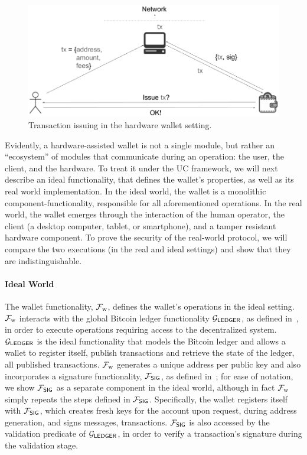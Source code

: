 \begin{figure}
    \begin{center}
        \includegraphics[width=0.75\columnwidth]{figures/hardware-wallets/user_wallet_bw.png}
    \end{center}
    \caption{Transaction issuing in the hardware wallet setting.}
    \label{fig:user_wallet}
\end{figure}

Evidently, a hardware-assisted wallet is not a single module, but rather an
``ecosystem'' of modules that communicate during an operation: the user, the
client, and the hardware. To treat it under the UC framework, we will next
describe an ideal functionality, that defines the wallet's properties, as well
as its real world implementation. In the ideal world, the wallet is a
monolithic component-functionality, responsible for all aforementioned
operations.  In the real world, the wallet emerges through the interaction of
the human operator, the client (\ie a desktop computer, tablet, or smartphone),
and a tamper resistant hardware component. To prove the security of the
real-world protocol, we will compare the two executions (in the real and ideal
settings) and show that they are indistinguishable.

\paragraph{Ideal World}
The wallet functionality, $\mathcal{F}_{\mathrm{w}}$, defines the wallet's operations in the ideal
setting. $\mathcal{F}_{\mathrm{w}}$ interacts with the global Bitcoin ledger functionality $\mathcal{G}_\mathsf{LEDGER}$,
as defined in~\cite{C:BMTZ17}, in order to execute operations requiring access
to the decentralized system. $\mathcal{G}_\mathsf{LEDGER}$ is the ideal functionality that models
the Bitcoin ledger and allows a wallet to register itself, publish transactions
and retrieve the state of the ledger, \ie all published transactions. $\mathcal{F}_{\mathrm{w}}$
generates a unique address per public key and also incorporates a signature
functionality, $\mathcal{F}_\mathsf{SIG}$, as defined in~\cite{EPRINT:Canetti03}; for ease of
notation, we show $\mathcal{F}_\mathsf{SIG}$ as a separate component in the ideal world, although
in fact $\mathcal{F}_{\mathrm{w}}$ simply repeats the steps defined in $\mathcal{F}_\mathsf{SIG}$. Specifically, the
wallet registers itself with $\mathcal{F}_\mathsf{SIG}$, which creates fresh keys for the account
upon request, \eg during address generation, and signs messages, \eg
transactions. $\mathcal{F}_\mathsf{SIG}$ is also accessed by the validation predicate of $\mathcal{G}_\mathsf{LEDGER}$,
in order to verify a transaction's signature during the validation stage.

